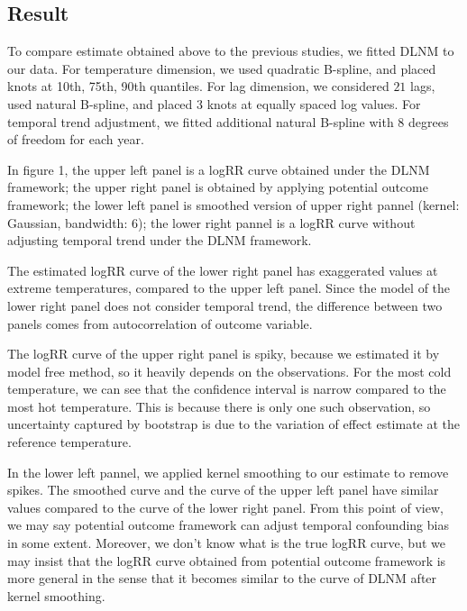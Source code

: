\documentclass[12pt]{article}
\begin{document}
\subsection{Result}

To compare estimate obtained above to the previous studies, we fitted DLNM to our data.
For temperature dimension, 
we used quadratic B-spline, and placed knots at 10th, 75th, 90th quantiles.
For lag dimension,
we considered $21$ lags, used natural B-spline, and placed $3$ knots at equally spaced log values.
For temporal trend adjustment,
we fitted additional natural B-spline with $8$ degrees of freedom for each year.

In figure 1,
the upper left panel is a logRR curve obtained under the DLNM framework;
the upper right panel is obtained by applying potential outcome framework;
the lower left panel is smoothed version of upper right pannel (kernel: Gaussian, bandwidth: $6$);
the lower right pannel is a logRR curve without adjusting temporal trend under the DLNM framework.

The estimated logRR curve of the lower right panel has exaggerated values at extreme temperatures,
compared to the upper left panel.
Since the model of the lower right panel does not consider temporal trend,
the difference between two panels comes from autocorrelation of outcome variable.

The logRR curve of the upper right panel is spiky,
because we estimated it by model free method, so it heavily depends on the observations.
For the most cold temperature, 
we can see that the confidence interval is narrow compared to the most hot temperature.
This is because there is only one such observation,
so uncertainty captured by bootstrap is due to the variation of effect estimate at the reference temperature.

In the lower left pannel, we applied kernel smoothing to our estimate to remove spikes.
The smoothed curve and the curve of the upper left panel have similar values 
compared to the curve of the lower right panel.
From this point of view, 
we may say potential outcome framework can adjust temporal confounding bias in some extent.
Moreover, we don't know what is the true logRR curve,
but we may insist that the logRR curve obtained from potential outcome framework is more general
in the sense that it becomes similar to the curve of DLNM after kernel smoothing.
\end{document}
